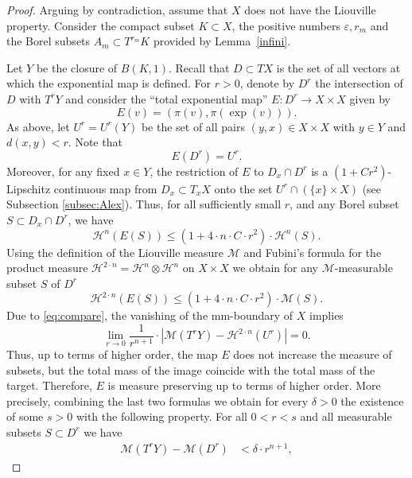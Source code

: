 \documentclass[12pt,leqno,intlimits]{amsart}
\numberwithin{equation}{section}
\theoremstyle{definition}
\theoremstyle{remark}
\newcommand{\lref}[1]{Lemma~\ref{#1}}
\def\:{\colon}
\begin{document}
\begin{proof}
Arguing by contradiction, assume that $X$ does not have the Liouville property.
Consider the compact subset $K \subset X$, the positive numbers $\varepsilon, r_m$ and the Borel
subsets $A_m\subset T^{r_m} K$ provided by \lref{infini}.

Let $Y$ be the closure of $B (K,1)$.
Recall that $D\subset TX$ is the set of all vectors at which the exponential map is defined.
For $r>0$, denote by $D^r$ the intersection of $D$ with $T^r Y$ and consider the ``total exponential map''
$E\:D^r \to X\times X$ given by
$$E(v)= (\pi (v), \pi (\exp (v))).$$
As above, let $U^r =U^r(Y)$ be the set of all
pairs $(y,x) \in X\times X$ with $y\in Y$ and $d(x,y)<r$.
Note that
\begin{equation} \label{eq:image}
E(D^r) =U^r.
\end{equation}
Moreover, for any fixed $x \in Y$, the restriction of $E$ to $D_x \cap D^r$ is
a $(1+ C r^2)$-Lipschitz continuous map from $D_x\subset T_xX$ onto the set $U^r \cap (\{x \} \times X)$ (see Subsection \ref{subsec:Alex}).
Thus, for all sufficiently small $r$, and any Borel subset $S\subset D_x \cap D^r$, we have
$$\mathcal H^n (E(S)) \leq (1+4{\cdot} n{\cdot}  C{\cdot}  r^2)\cdot \mathcal H^n (S).$$
Using the definition of the Liouville measure $\mathcal M$ and Fubini's formula for the product measure
$\mathcal H^{2\cdot n} =\mathcal H^n \otimes \mathcal H^n $ on $X\times X$ we obtain for any $\mathcal M$-measurable subset $S$ of $D^r$
\begin{equation} \label{eq:contract}
\mathcal H^{2\cdot n} (E(S)) \leq (1+4{\cdot} n{\cdot} C{\cdot}  r^2) \cdot \mathcal M(S).
\end{equation}
Due to \eqref{eq:compare}, the vanishing  of the mm-boundary of $X$ implies
$$\lim _{r\to 0} \frac 1 {r^{n+1} }\cdot |\mathcal M(T^{r} Y) -\mathcal H^{2\cdot n} (U^r)| =0.$$
Thus, up to terms of higher order, the map $E$ does not increase the measure of subsets, but the total mass of the image
coincide with the total mass of the target.
Therefore, $E$ is measure preserving up to terms of higher order.
More precisely, combining the last two formulas we obtain for every $\delta >0$ the existence of some $s>0$ with the following property. For all $0<r<s$ and all measurable subsets $S\subset D^r$
we have
\begin{equation} \label{eq:almostall}
\begin{aligned}
 \mathcal M (T^r Y)- \mathcal M (D^r) &< \delta{\cdot}r^{n+1},

\end{aligned}
\end{equation}
\end{proof}
\end{document}
